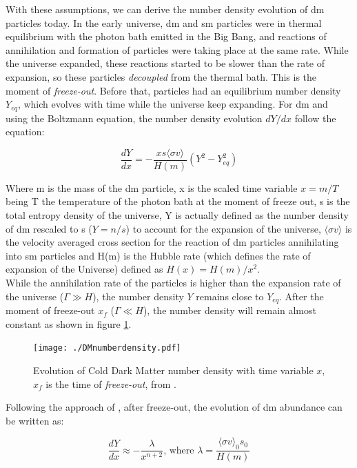 \documentclass[main.tex]{subfiles}
\begin{document}
With these assumptions, we can derive the number density evolution of \gls{dm} particles today. In the early universe, \gls{dm} and \gls{sm} particles were in thermal equilibrium with the photon bath emitted in the Big Bang, and reactions of annihilation and formation of particles were taking place at the same rate. While the universe expanded, these reactions started to be slower than the rate of expansion, so these particles \textit{decoupled} from the thermal bath. This is the moment of \textit{freeze-out}. Before that, particles had an equilibrium number density $Y_{eq}$, which evolves with time while the universe keep expanding. For \gls{dm} and using the Boltzmann equation, the number density evolution $dY/dx$ follow the equation:

\begin{equation}
    \frac{dY}{dx} = -\frac{xs\langle\sigma v\rangle}{H(m)}(Y^{2}-Y^{2}_{eq})
    \label{eq:dmabundance}
\end{equation}

Where m is the mass of the \gls{dm} particle, x is the scaled time variable $x=m/T$ being T the temperature of the photon bath at the moment of freeze out, s is the total entropy density of the universe, Y is actually defined as the number density of \gls{dm} rescaled to s ($Y = n/s$) to account for the expansion of the universe, $\langle\sigma v\rangle$ is the velocity averaged cross section for the reaction of \gls{dm} particles annihilating into \gls{sm} particles and H(m) is the Hubble rate (which defines the rate of expansion of the Universe) defined as $H(x) = H(m)/x^2$.\\
While the annihilation rate of the particles is higher than the expansion rate of the universe ($\Gamma \gg H $), the number density $Y$ remains close to $Y_{eq}$. After the moment of freeze-out $x_f$ ($\Gamma \ll H$), the number density will remain almost constant as shown in figure \ref{fig:DMn}. 

\begin{figure}
\centering
 \texttt{[image: ./DMnumberdensity.pdf]}
  \caption{Evolution of Cold Dark Matter number density with time variable $x$, $x_{f}$ is the time of \textit{freeze-out}, from \cite{2017DMlectures}.}
    \label{fig:DMn}
\end{figure}

Following the approach of \cite{2017DMlectures}, after freeze-out, the evolution of \gls{dm} abundance can be written as:

\begin{equation}
    \frac{dY}{dx}\approx - \frac{\lambda}{x^{n+2}} \textrm{, where } \lambda = \frac{\langle\sigma v \rangle_{0}s_{0}}{H(m)}
\end{equation}
\end{document}
